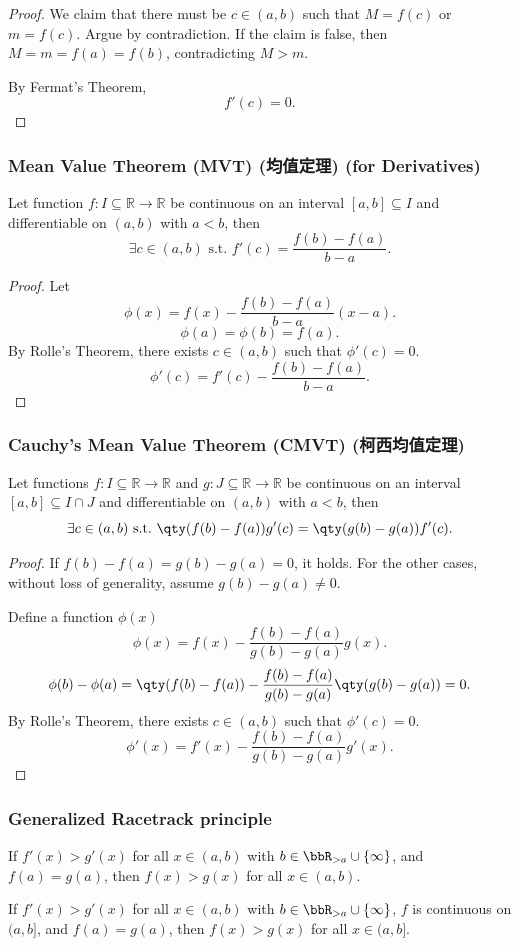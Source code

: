 \documentclass[a4paper,12pt]{report}
\begin{document}
\begin{itemize}
\begin{itemize}
\begin{proof}
We claim that there must be $c\in (a,b)$ such that $M=f(c)$ or $m=f(c)$. Argue by contradiction. If the claim is false, then $M=m=f(a)=f(b)$, contradicting $M>m$.

By Fermat's Theorem,
\[f'(c)=0.\]
\end{proof}
\subsubsection{Mean Value Theorem (MVT) (均值定理) (for Derivatives)}
Let function $f\colon I\subseteq\mathbb{R}\to\mathbb{R}$ be continuous on an interval $[a, b]\subseteq I$ and differentiable on $(a,b)$ with $a<b$, then
\[\exists c\in (a, b)\text{\ s.t.\ }f'(c)=\frac{f(b)-f(a)}{b-a}.\]
\begin{proof}
Let
\[\phi(x) = f(x) - \frac{f(b)-f(a)}{b-a} (x-a).\]
\[\phi(a)=\phi(b)=f(a).\]
By Rolle's Theorem, there exists $c\in (a,b)$ such that $\phi'(c)=0$.
\[\phi'(c)=f'(c)-\frac{f(b)-f(a)}{b-a}.\]
\end{proof}
\subsubsection{Cauchy's Mean Value Theorem (CMVT) (柯西均值定理)}
Let functions $f\colon I\subseteq\mathbb{R}\to\mathbb{R}$ and $g\colon J\subseteq\mathbb{R}\to\mathbb{R}$ be continuous on an interval $[a, b]\subseteq I\cap J$ and differentiable on $(a,b)$ with $a<b$, then
\[\exists c\in (a,b)\text{\ s.t.\ }\qty(f(b)-f(a))g'(c)=\qty(g(b)-g(a))f'(c).\]
\begin{proof}
    If $f(b)-f(a)=g(b)-g(a)=0$, it holds. For the other cases, without loss of generality, assume $g(b)-g(a)\neq 0$.

    Define a function $\phi(x)$
    \[\phi(x)=f(x)-\frac{f(b)-f(a)}{g(b)-g(a)}g(x).\]
    \[\phi(b)-\phi(a)=\qty(f(b)-f(a))-\frac{f(b)-f(a)}{g(b)-g(a)}\qty(g(b)-g(a))=0.\]
    By Rolle's Theorem, there exists $c\in (a,b)$ such that $\phi'(c)=0$.
    \[\phi'(x)=f'(x)-\frac{f(b)-f(a)}{g(b)-g(a)}g'(x).\]
\end{proof}
\subsubsection{Generalized Racetrack principle}
If $f'(x)>g'(x)$ for all $x\in (a,b)$ with $b\in\bbR_{>a}\cup\{\infty\}$, and $f(a)=g(a)$, then $f(x)>g(x)$ for all $x\in(a,b)$.

If $f'(x)>g'(x)$ for all $x\in (a,b)$ with $b\in\bbR_{>a}\cup\{\infty\}$, $f$ is continuous on $(a,b]$, and $f(a)=g(a)$, then $f(x)>g(x)$ for all $x\in(a,b]$.


\end{itemize}
\end{itemize}
\end{document}
